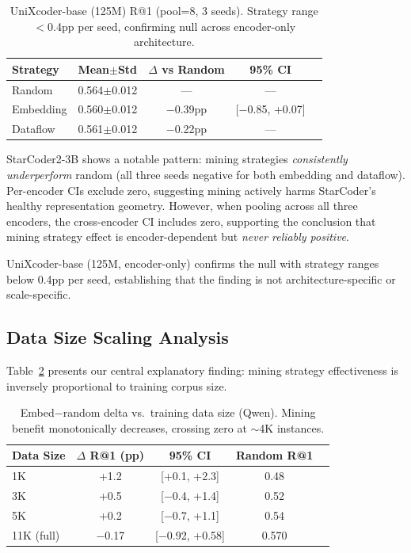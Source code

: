 \documentclass[11pt,a4paper]{article}
\begin{document}
\begin{table}[t]
\centering
\small
\begin{tabular}{lcccc}
\toprule
Strategy & Mean$\pm$Std & $\Delta$ vs Random & 95\% CI \\
\midrule
Random & 0.564$\pm$0.012 & --- & --- \\
Embedding & 0.560$\pm$0.012 & $-$0.39pp & [$-$0.85, +0.07] \\
Dataflow & 0.561$\pm$0.012 & $-$0.22pp & --- \\
\bottomrule
\end{tabular}
\caption{UniXcoder-base (125M) R@1 (pool=8, 3 seeds). Strategy range $<$0.4pp per seed, confirming null across encoder-only architecture.}
\label{tab:unixcoder_main}
\end{table}

StarCoder2-3B shows a notable pattern: mining strategies \textit{consistently underperform} random (all three seeds negative for both embedding and dataflow).
Per-encoder CIs exclude zero, suggesting mining actively harms StarCoder's healthy representation geometry.
However, when pooling across all three encoders, the cross-encoder CI includes zero, supporting the conclusion that mining strategy effect is encoder-dependent but \textit{never reliably positive}.

UniXcoder-base (125M, encoder-only) confirms the null with strategy ranges below 0.4pp per seed, establishing that the finding is not architecture-specific or scale-specific.

\subsection{Data Size Scaling Analysis}

Table~\ref{tab:scaling} presents our central explanatory finding: mining strategy effectiveness is inversely proportional to training corpus size.

\begin{table}[t]
\centering
\small
\begin{tabular}{lcccc}
\toprule
Data Size & $\Delta$ R@1 (pp) & 95\% CI & Random R@1 \\
\midrule
1K & +1.2 & [+0.1, +2.3] & 0.48 \\
3K & +0.5 & [$-$0.4, +1.4] & 0.52 \\
5K & +0.2 & [$-$0.7, +1.1] & 0.54 \\
11K (full) & $-$0.17 & [$-$0.92, +0.58] & 0.570 \\
\bottomrule
\end{tabular}
\caption{Embed$-$random delta vs.\ training data size (Qwen). Mining benefit monotonically decreases, crossing zero at $\sim$4K instances.}
\label{tab:scaling}
\end{table}
\end{document}
